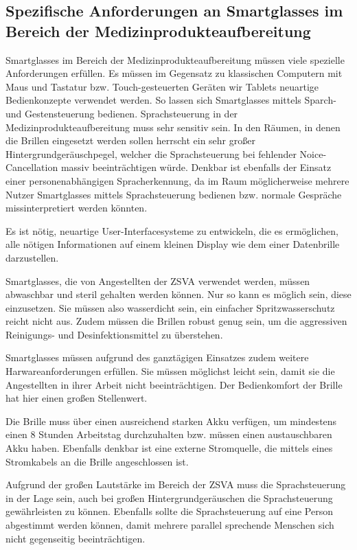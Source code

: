 \subsection{Spezifische Anforderungen an Smartglasses im Bereich der Medizinprodukteaufbereitung}
Smartglasses im Bereich der Medizinprodukteaufbereitung müssen viele spezielle Anforderungen erfüllen. Es müssen im Gegensatz zu klassischen Computern mit Maus und Tastatur bzw. Touch-gesteuerten Geräten wir Tablets neuartige Bedienkonzepte verwendet werden. So lassen sich Smartglasses mittels Sparch- und Gestensteuerung bedienen.
Sprachsteuerung in der Medizinprodukteaufbereitung muss sehr sensitiv sein. In den Räumen, in denen die Brillen eingesetzt werden sollen herrscht ein sehr großer Hintergrundgeräuschpegel, welcher die Sprachsteuerung bei fehlender Noice-Cancellation massiv beeinträchtigen würde. Denkbar ist ebenfalls der Einsatz einer personenabhängigen Spracherkennung, da im Raum möglicherweise mehrere Nutzer Smartglasses mittels Sprachsteuerung bedienen bzw. normale Gespräche missinterpretiert werden könnten. 

Es ist nötig, neuartige User-Interfacesysteme zu entwickeln, die es ermöglichen, alle nötigen Informationen auf einem kleinen Display wie dem einer Datenbrille darzustellen. 

Smartglasses, die von Angestellten der ZSVA verwendet werden, müssen abwaschbar und steril gehalten werden können. Nur so kann es möglich sein, diese einzusetzen. Sie müssen also wasserdicht sein, ein einfacher Spritzwasserschutz reicht nicht aus. Zudem müssen die Brillen robust genug sein, um die aggressiven Reinigungs- und Desinfektionsmittel zu überstehen.

Smartglasses müssen aufgrund des ganztägigen Einsatzes zudem weitere Harwareanforderungen erfüllen. Sie müssen möglichst leicht sein, damit sie die Angestellten in ihrer Arbeit nicht beeinträchtigen. Der Bedienkomfort der Brille hat hier einen großen Stellenwert. 

Die Brille muss über einen ausreichend starken Akku verfügen, um mindestens einen 8 Stunden Arbeitstag durchzuhalten bzw. müssen einen austauschbaren Akku haben. Ebenfalls denkbar ist eine externe Stromquelle, die mittels eines Stromkabels an die Brille angeschlossen ist.

Aufgrund der großen Lautstärke im Bereich der ZSVA muss die Sprachsteuerung in der Lage sein, auch bei großen Hintergrundgeräuschen die Sprachsteuerung gewährleisten zu können. Ebenfalls sollte die Sprachsteuerung auf eine Person abgestimmt werden können, damit mehrere parallel sprechende Menschen sich nicht gegenseitig beeinträchtigen.

